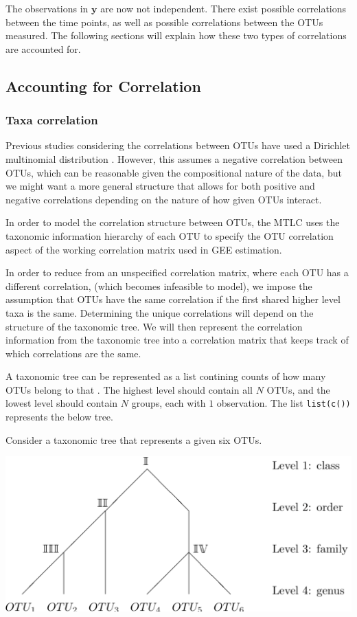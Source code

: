 \documentclass[12pt]{article}
\begin{document}
The observations in $\mathbf{y}$ are now not independent. There exist possible correlations between the time points, as well as possible correlations between the OTUs measured. The following sections will explain how these two types of correlations are accounted for.

\subsection{Accounting for Correlation}
\subsubsection{Taxa correlation}

Previous studies considering the correlations between OTUs have used a Dirichlet multinomial distribution \cite{la2012hypothesis}. However, this assumes a negative correlation between OTUs, which can be reasonable given the compositional nature of the data, but we might want a more general structure that allows for both positive and negative correlations depending on the nature of how given OTUs interact.

In order to model the correlation structure between OTUs, the MTLC uses the taxonomic information hierarchy of each OTU to specify the OTU correlation aspect of the working correlation matrix used in GEE estimation.


In order to reduce from an unspecified correlation matrix, where each OTU has a different correlation, (which becomes infeasible to model), we impose the assumption that OTUs have the same correlation if the first shared higher level taxa is the same. Determining the unique correlations will depend on the structure of the taxonomic tree. We will then represent the correlation information from the taxonomic tree into a correlation matrix that keeps track of which correlations are the same.

A taxonomic tree can be represented as a list contining counts of how many OTUs belong to that . The highest level should contain all $N$ OTUs, and the lowest level should contain $N$ groups, each with $1$ observation. The list \texttt{list(c())} represents the below tree.

Consider a taxonomic tree that represents a given six OTUs.

\includegraphics[width = .5\textwidth]{otu_tree.png}
\end{document}

